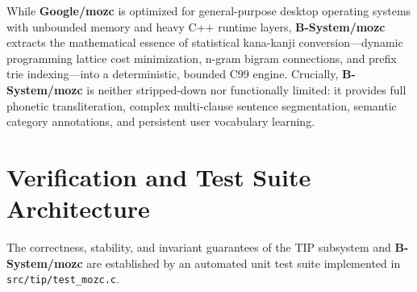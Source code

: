 \documentclass[10pt,journal,compsoc,twocolumn]{article}
\begin{document}
While \textbf{Google/mozc} is optimized for general-purpose desktop operating systems with unbounded memory and heavy C++ runtime layers, \textbf{B-System/mozc} extracts the mathematical essence of statistical kana-kanji conversion---dynamic programming lattice cost minimization, n-gram bigram connections, and prefix trie indexing---into a deterministic, bounded C99 engine. Crucially, \textbf{B-System/mozc} is neither stripped-down nor functionally limited: it provides full phonetic transliteration, complex multi-clause sentence segmentation, semantic category annotations, and persistent user vocabulary learning.

\section{Verification and Test Suite Architecture}
\label{sec:test_suite}

The correctness, stability, and invariant guarantees of the TIP subsystem and \textbf{B-System/mozc} are established by an automated unit test suite implemented in \texttt{src/tip/test\_mozc.c}.
\end{document}
